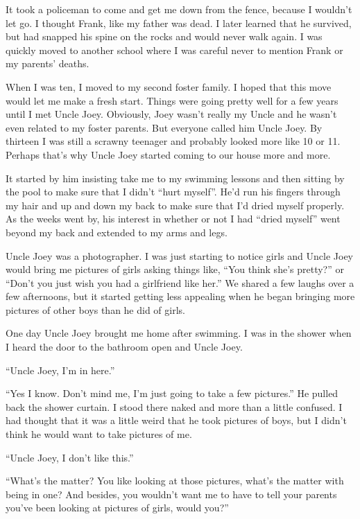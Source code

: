 \documentclass[11pt,letterpaper]{article}
\begin{document}
It took a policeman to come and get me down from the fence, because I wouldn't let go. I thought Frank, like my father was dead. I later learned that he survived, but had snapped his spine on the rocks and would never walk again. I was quickly moved to another school where I was careful never to mention Frank or my parents' deaths.

When I was ten, I moved to my second foster family. I hoped that this move would let me make a fresh start. Things were going pretty well for a few years until I met Uncle Joey. Obviously, Joey wasn't really my Uncle and he wasn't even related to my foster parents. But everyone called him Uncle Joey. By thirteen I was still a scrawny teenager and probably looked more like 10 or 11. Perhaps that's why Uncle Joey started coming to our house more and more.

It started by him insisting take me to my swimming lessons and then sitting by the pool to make sure that I didn't ``hurt myself''. He'd run his fingers through my hair and up and down my back to make sure that I'd dried myself properly. As the weeks went by, his interest in whether or not I had ``dried myself'' went beyond my back and extended to my arms and legs.

Uncle Joey was a photographer. I was just starting to notice girls and Uncle Joey would bring me pictures of girls asking things like, ``You think she's pretty?'' or ``Don't you just wish you had a girlfriend like her.'' We shared a few laughs over a few afternoons, but it started getting less appealing when he began bringing more pictures of other boys than he did of girls.

One day Uncle Joey brought me home after swimming. I was in the shower when I heard the door to the bathroom open and Uncle Joey.

``Uncle Joey, I'm in here.''

``Yes I know. Don't mind me, I'm just going to take a few pictures.'' He pulled back the shower curtain. I stood there naked and more than a little confused. I had thought that it was a little weird that he took pictures of boys, but I didn't think he would want to take pictures of me.

``Uncle Joey, I don't like this.''

``What's the matter? You like looking at those pictures, what's the matter with being in one? And besides, you wouldn't want me to have to tell your parents you've been looking at pictures of girls, would  you?''
\end{document}
